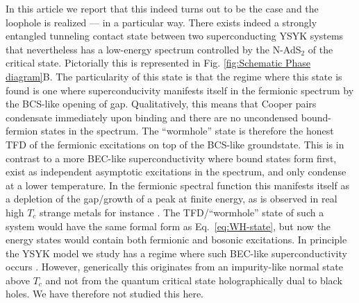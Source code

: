 In this article we report that this indeed turns out to be the case and the loophole is realized --- in a particular way. There exists indeed a strongly entangled tunneling contact state between two superconducting YSYK systems that nevertheless has a low-energy spectrum controlled by the N-AdS$_2$ of the critical state. Pictorially this is represented in Fig. \ref{fig:Schematic Phase diagram}B.
The particularity of this state is that the regime where this state is found is one where superconducivity manifests itself in the fermionic spectrum by the BCS-like opening of gap. Qualitatively, this means that Cooper pairs condensate immediately upon binding and there are no uncondensed bound-fermion states in the spectrum. 
The ``wormhole'' state is therefore the honest TFD of the fermionic excitations on top of the BCS-like groundstate. This is in contrast to a more BEC-like superconductivity where bound states form first, exist as independent asymptotic excitations in the spectrum, and only condense at a lower temperature. In the fermionic spectral function this manifests itself as a depletion of the gap/growth of a peak at finite energy, as is observed in real high $T_c$ strange metals for instance \cite{kondoPointNodesPersisting2015,reberPairingPairbreakingTheir2015a,liCoherentOrganizationElectronic2018,bastiaansDirectEvidenceCooper2021,trompPuddleFormationPersistent2023}. The TFD/``wormhole'' state of such a system would have the same formal form as Eq.~\eqref{eq:WH-state}, but now the energy states would contain both fermionic and bosonic excitations. In principle the YSYK model we study has a regime where such BEC-like superconductivity occurs \cite{esterlis2019cooper}. However, generically this originates from an impurity-like normal state above $T_c$ and not from the quantum critical state holographically dual to black holes. We have therefore not studied this here.


